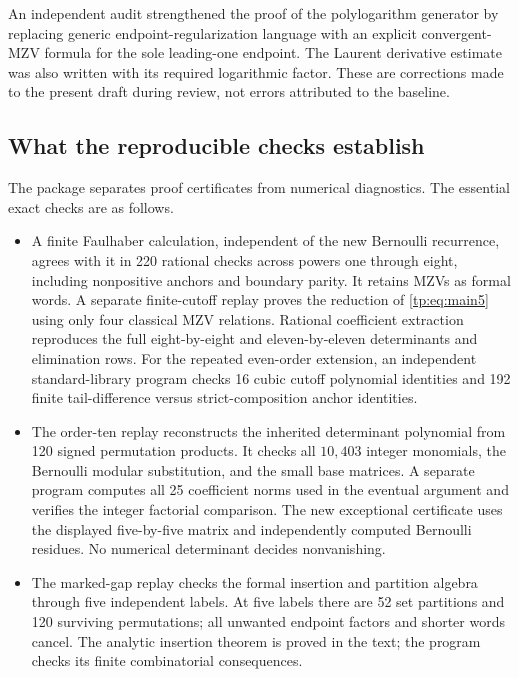 An independent audit strengthened the proof of the polylogarithm
generator by replacing generic endpoint-regularization language with
an explicit convergent-MZV formula for the sole leading-one endpoint.
The Laurent derivative estimate was also written with its required
logarithmic factor. These are corrections made to the present draft
during review, not errors attributed to the baseline.

\subsection{What the reproducible checks establish}

The package separates proof certificates from numerical diagnostics.
The essential exact checks are as follows.

\begin{itemize}
\item A finite Faulhaber calculation, independent of the new Bernoulli
recurrence, agrees with it in 220 rational checks across powers one
through eight, including nonpositive anchors and boundary parity.
It retains MZVs as formal words. A separate finite-cutoff replay proves
the reduction of \eqref{tp:eq:main5} using only four classical MZV
relations. Rational coefficient extraction reproduces the full
eight-by-eight and eleven-by-eleven determinants and elimination rows.
For the repeated even-order extension, an independent standard-library
program checks 16 cubic cutoff polynomial identities and 192 finite
tail-difference versus strict-composition anchor identities.

\item The order-ten replay reconstructs the inherited determinant
polynomial from 120 signed permutation products. It checks all
$10{,}403$ integer monomials, the Bernoulli modular substitution,
and the small base matrices. A separate program computes all 25
coefficient norms used in the eventual argument and verifies the
integer factorial comparison. The new exceptional certificate uses
the displayed five-by-five matrix and independently computed Bernoulli
residues. No numerical determinant decides nonvanishing.

\item The marked-gap replay checks the formal insertion and partition
algebra through five independent labels. At five labels there are 52
set partitions and 120 surviving permutations; all unwanted endpoint
factors and shorter words cancel. The analytic insertion theorem is
proved in the text; the program checks its finite combinatorial
consequences.
\end{itemize}

